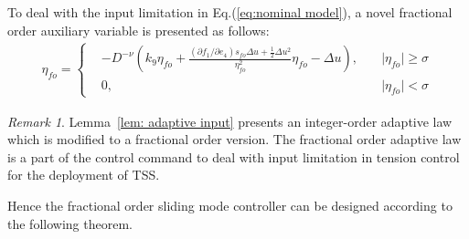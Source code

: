 \documentclass[ShortAfour]{sage}
\theoremstyle{plain}
\theoremstyle{remark}
\newtheorem{myrem}{Remark}
\begin{document}
To deal with the input limitation in Eq.(\ref{eq:nominal model}), a novel fractional order auxiliary variable is presented as follows:
\begin{align}
\eta_{fo}=\left\{
\begin{aligned}
&-D^{-\nu}\left(k_9\eta_{fo}+\frac{(\partial f_1/\partial e_4)s_{fo}\Delta u+\frac{1}{2}\Delta u^2}{\eta_{fo}^2}\eta_{fo}-\Delta u\right),\quad&\vert\eta_{fo}\vert\ge\sigma \\
&0,\quad&\vert\eta_{fo}\vert<\sigma \end{aligned}
\right.\label{eq:adaptionfo}
\end{align}
\begin{myrem}
  Lemma~\ref{lem: adaptive input} presents an integer-order adaptive law which is modified to a fractional order version. The fractional order adaptive law is a part of the control command to deal with input limitation in tension control for the deployment of TSS.  
\end{myrem}
Hence the fractional order sliding mode controller can be designed according to the following theorem.
\end{document}
